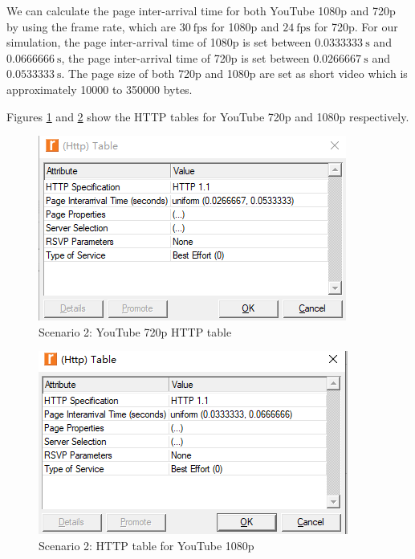 We can calculate the page inter-arrival time for both YouTube 1080p and 720p by using the frame rate, which are $30~\mathrm{fps}$ for 1080p and $24~\mathrm{fps}$ for 720p. For our simulation, the page inter-arrival time of 1080p is set between $0.0333333~\mathrm{s}$ and $0.0666666~\mathrm{s}$, the page inter-arrival time of 720p is set between $0.0266667~\mathrm{s}$ and $0.0533333~\mathrm{s}$. The page size of both 720p and 1080p are set as short video which is approximately 10000 to 350000 bytes.

Figures \ref{fig:2:http:720p} and \ref{fig:2:http:1080p} show the \gls{HTTP} tables for YouTube 720p and 1080p respectively.
\begin{figure}[H]
	\centering
	\includegraphics[scale=0.55]{Figures/amantianrenamed/Scenario2YouTube720phttptable.png}
	\caption[Scenario 2: YouTube 720p HTTP table]{Scenario 2: YouTube 720p \gls{HTTP} table}
	\label{fig:2:http:720p}
\end{figure}

\begin{figure}[H]
	\centering
	\includegraphics[scale=0.6]{Figures/amantianrenamed/Scenario21080phttpable.png}
	\caption[Scenario 2: HTTP table for YouTube 1080p]{Scenario 2: \gls{HTTP} table for YouTube 1080p}
	\label{fig:2:http:1080p}
\end{figure}

